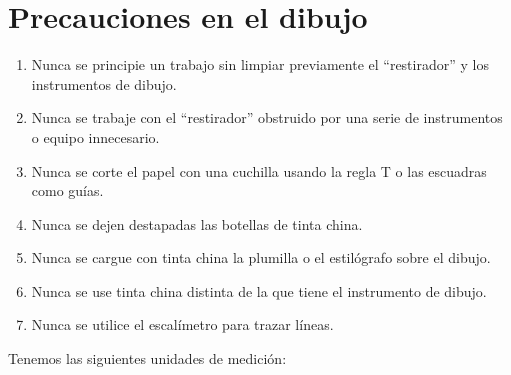 \section{Precauciones en el dibujo}
\begin{enumerate}
	\item Nunca se principie un trabajo sin limpiar previamente el ``restirador'' y los
	      instrumentos de dibujo.
	\item Nunca se trabaje con el ``restirador'' obstruido por una serie de instrumentos
	      o equipo innecesario.
	\item Nunca se corte el papel con una cuchilla usando la regla T o las escuadras
	      como guías.
	\item Nunca se dejen destapadas las botellas de tinta china.
	\item Nunca se cargue con tinta china la plumilla o el estilógrafo sobre el dibujo.
	\item Nunca se use tinta china distinta de la que tiene el instrumento de dibujo.
	\item Nunca se utilice el escalímetro para trazar líneas.
\end{enumerate}

Tenemos las siguientes unidades de medición:

